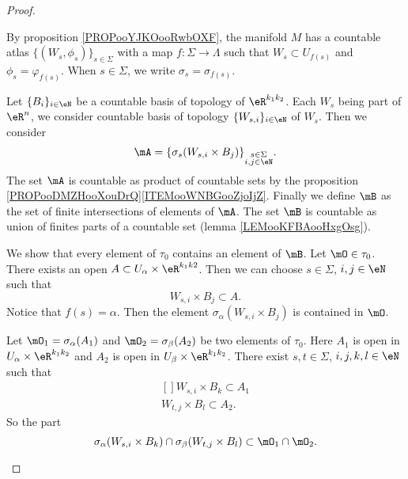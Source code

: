 \begin{proof}
\begin{subproof}
		\begin{subproof}
			By proposition \ref{PROPooYJKOooRwbOXF}, the manifold \( M\) has a countable atlas \( \{ (W_{s},\phi_{s}) \}_{s\in \Sigma}\) with a map \(f \colon \Sigma\to \Lambda  \) such that \( W_{s}\subset U_{f(s)}\) and \( \phi_{s}=\varphi_{f(s)}\). When \( s\in \Sigma\), we write \( \sigma_{s}=\sigma_{f(s)}\).

			Let \( \{ B_i \}_{i\in \eN}\) be a countable basis of topology of \( \eR^{k_1k_2}\). Each \( W_{s}\) being part of \( \eR^n\), we consider countable basis of topology \( \{ W_{s,i} \}_{i\in \eN}\) of \( W_{s}\). Then we consider
			\begin{equation}
				\mA=\{ \sigma_{s}(W_{s,i}\times B_j) \}_{\substack{ s\in\Sigma \\ i,j\in \eN }  }.
			\end{equation}
			The set \( \mA\) is countable as product of countable sets by the proposition \ref{PROPooDMZHooXouDrQ}\ref{ITEMooWNBGooZjoIjZ}. Finally we define \( \mB\) as the set of finite intersections of elements of \( \mA\). The set \( \mB\) is countable as union of finites parts of a countable set (lemma \ref{LEMooKFBAooHxgOsg}).


			We show that every element of \( \tau_0\) contains an element of \(\mB\). Let \( \mO\in \tau_0\). There exists an open \( A\subset U_{\alpha}\times \eR^{k_1k2}\). Then we can choose \( s\in \Sigma\), \( i,j\in \eN\) such that
			\begin{equation}
				W_{s,i}\times B_j\subset A.
			\end{equation}
			Notice that \( f(s)=\alpha\). Then the element \( \sigma_{\alpha}(W_{s,i}\times B_j)\) is contained in \( \mO\).


			Let \( \mO_1=\sigma_{\alpha}(A_1)\) and \( \mO_2=\sigma_{\beta}(A_2)\) be two elements of \( \tau_0\). Here \( A_1\) is open in \( U_{\alpha}\times \eR^{k_1k_2}\) and \( A_2\) is open in \( U_{\beta}\times \eR^{k_1k_2}\). There exist \( s,t\in \Sigma\), \( i,j,k,l\in \eN\) such that
			\begin{equation}
				\begin{aligned}[]
					W_{s,i}\times B_k\subset A_1 \\
					W_{t,j}\times B_l\subset A_2.
				\end{aligned}
			\end{equation}
			So the part
			\begin{equation}
				\sigma_{\alpha}(W_{s,i}\times B_k)\cap\sigma_{\beta}(W_{t,j}\times B_l)\subset\mO_1\cap\mO_2.
			\end{equation}


\end{subproof}
\end{subproof}
\end{proof}
